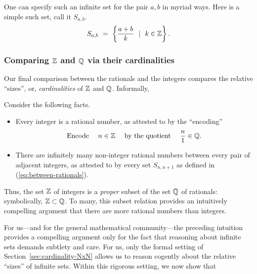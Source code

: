 \smallskip

One can specify such an infinite set for the pair $a,b$ in myriad ways.  Here is a simple such set, call it $S_{a,b}$.
\begin{equation}
\label{eq:between-rationals}
S_{a,b} \ = \ \left\{ \frac{a+b}{k} \ \ | \ \ k \in \mathbb{Z} \right\}.
\end{equation}

\subsubsection{Comparing $\mathbb{Z}$ and $\mathbb{Q}$ via their cardinalities}
\label{sec:Q-Z-cardinality}

Our final comparison between the rationals and the integers compares the relative ``sizes'', or, {\em cardinalities} of $\mathbb{Z}$ and $\mathbb{Q}$.  Informally, 

\smallskip

\hspace*{.35in}{\it Are there ``more'' rationals than integers?}

\medskip

\noindent Consider the following facts.
\begin{itemize}
\item
Every integer is a rational number, as attested to by the ``encoding''
\begin{equation}
\label{eq:ZintoQ}
\mbox{Encode } \ \ \ n \in \mathbb{Z} \ \ \ \mbox{ by the quotient } \ \ \ {n \over 1} \in \mathbb{Q} .
\end{equation}

\item
There are infinitely many non-integer rational numbers between every pair of adjacent integers, as attested to by every set $S_{n,n+1}$ as defined in (\ref{eq:between-rationals}).
\end{itemize}
Thus, the set $\mathbb{Z}$ of integers is a {\em proper} subset of the set $\mathbb{Q}$ of rationals: symbolically, $\mathbb{Z} \subset \mathbb{Q}$.  To many, this subset relation provides an intuitively compelling argument that there are more rational numbers than integers.

For us---and for the general mathematical community---the preceding intuition provides a compelling argument only for the fact that reasoning about infinite sets demands subtlety and care.  For us, only the formal setting of Section~\ref{sec:cardinality-NxN} allows us to reason cogently about the relative ``sizes'' of infinite sets.  Within this rigorous setting, we now show that

